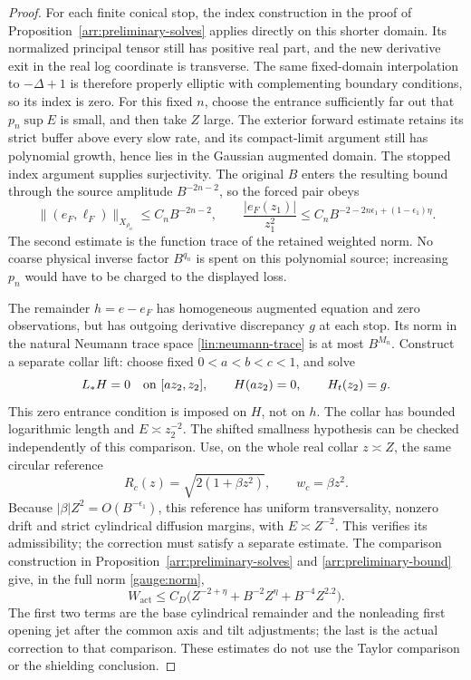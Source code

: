 \begin{proof}
For each finite conical stop, the index construction in the proof of
Proposition~\ref{arr:preliminary-solves} applies directly on this shorter
domain.  Its normalized principal tensor still has positive real part,
and the new derivative exit in the real log coordinate is transverse.
The same
fixed-domain interpolation to $-\Delta+1$ is therefore properly elliptic
with complementing boundary conditions, so its index is zero.
For this fixed $n$, choose the entrance sufficiently far out that
$p_n\sup E$ is small, and then take $Z$ large.  The exterior forward
estimate retains its strict buffer above every slow rate, and its
compact-limit argument still has polynomial growth, hence lies in the
Gaussian augmented domain.  The stopped index argument supplies
surjectivity.  The original $B$ enters the resulting bound through
the source amplitude $B^{-2n-2}$, so the forced pair obeys
\[
 \|(e_F,\ell_F)\|_{X_{\rho_n}}\le C_n B^{-2n-2},\qquad
 \frac{|e_F(z_1)|}{z_1^2}
 \le C_nB^{-2-2n\epsilon_1+(1-\epsilon_1)\eta}.
\]
The second estimate is the function trace of the retained weighted norm.
No coarse physical inverse factor $B^{q_n}$ is spent on this polynomial
source; increasing $p_n$ would have to be charged to the displayed loss.

The remainder $h=e-e_F$ has homogeneous augmented equation and zero
observations, but has outgoing derivative discrepancy $g$ at each stop.
Its norm in the natural Neumann trace space
\eqref{lin:neumann-trace} is at most $B^{M_n}$.
Construct a separate collar lift: choose fixed $0<a<b<c<1$, and solve
\[
 L_*H=0\quad\hbox{on }[az_2,z_2],\qquad
 H(az_2)=0,\qquad H_t(z_2)=g.
\]
This zero entrance condition is imposed on $H$, not on $h$.
The collar has bounded logarithmic length and $E\asymp z_2^{-2}$.
The shifted smallness hypothesis can be checked independently of this
comparison.  Use, on the whole real collar $z\asymp Z$,
the same circular reference
\[
 R_c(z)=\sqrt{2(1+\beta z^2)},\qquad w_c=\beta z^2.
\]
Because $|\beta|Z^2=O(B^{-\epsilon_1})$, this reference has uniform
transversality, nonzero drift and strict cylindrical diffusion margins,
with $E\asymp Z^{-2}$.  This verifies its admissibility; the correction
must satisfy a separate estimate.  The comparison construction in
Proposition~\ref{arr:preliminary-solves} and
\eqref{arr:preliminary-bound} give, in the full norm
\eqref{gauge:norm},
\[
 W_{\mathrm{act}}\le C_D\bigl(
 Z^{-2+\eta}+B^{-2}Z^\eta+B^{-4}Z^{2.2}\bigr).
\]
The first two terms are the base cylindrical remainder and the nonleading
first opening jet after the common axis and tilt adjustments; the last
is the actual correction to that comparison.  These estimates do not
use the Taylor comparison or the shielding conclusion.


\end{proof}
